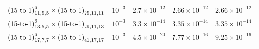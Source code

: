 \documentclass{report}
\begin{document}
{\begin{tabular}{|l|l|l|l|l|}
        \\
        $\textnormal{(15-to-1)}^6_{11,5,5}\times \textnormal{(15-to-1)}_{25,11,11}          $&$ 10^{-3}         $&$ 2.7 \times 10^{-12}        $&$ 2.66 \times 10^{-12}           $&$ 2.66 \times 10^{-12}   $                        
        \\
        $\textnormal{(15-to-1)}^6_{13,5,5}\times \textnormal{(15-to-1)}_{29,11,13}          $&$ 10^{-3}         $&$ 3.3 \times 10^{-14}        $&$ 3.35 \times 10^{-14}           $&$ 3.35 \times 10^{-14}   $                       
        \\
        $\textnormal{(15-to-1)}^6_{17,7,7}\times \textnormal{(15-to-1)}_{41,17,17}    $&$ 10^{-3}           $&$ 4.5 \times 10^{-20}        $&$ 7.77 \times 10^{-16}           $&$ 9.25 \times 10^{-16}   $
        \\
        \hline
    \end{tabular}
}
\end{document}

